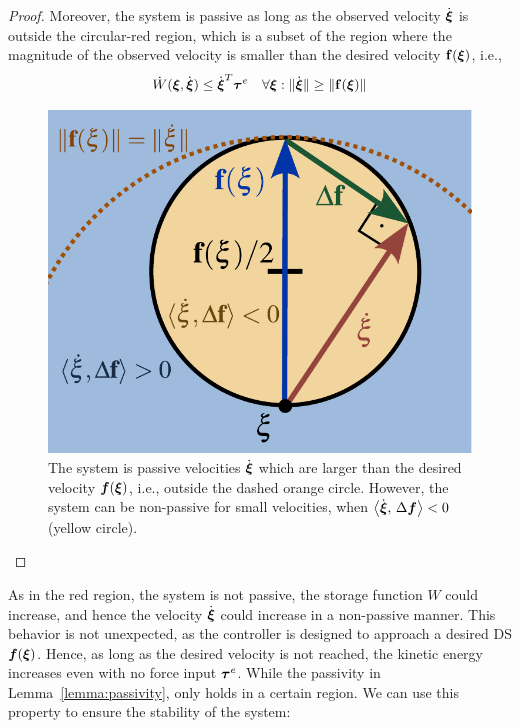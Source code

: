 \begin{proof}
Moreover, the system is passive as long as the observed velocity $\dot{{\boldsymbol{\xi}}}$ is outside the circular-red region, which is a subset of the region where the magnitude of the observed velocity is smaller than the desired velocity $\mathbf{f}({\boldsymbol{\xi}})$, i.e.,
\begin{equation}
	\dot W({\boldsymbol{\xi}}, \dot{{\boldsymbol{\xi}}}) \leq \dot{{\boldsymbol{\xi}}}^T \boldsymbol{\tau}^e
 \quad \forall {\boldsymbol{\xi}} : \| \dot{{\boldsymbol{\xi}}} \| \geq\| \mathbf{f}({\boldsymbol{\xi}}) \| 
\end{equation}

\begin{figure}[b]
	\centering
    \includegraphics[width=0.7\columnwidth]{figures/passivity_analysis}
	\caption{The system is passive velocities $\dot{\boldsymbol{\xi}}$ which are larger than the desired velocity $\boldsymbol{f}(\boldsymbol{\xi})$, i.e., outside the dashed orange circle.
    However, the system can be non-passive for small velocities, when  $\left\langle {\dot{\boldsymbol{\xi}}}, \, {\Delta \boldsymbol{f}} \right\rangle < 0$ (yellow circle). }
	\label{fig:passivity_analysis}
\end{figure}

\end{proof}

As in the red region, the system is not passive, the storage function $W$ could increase, and hence the velocity $\dot {\boldsymbol{\xi}}$ could increase in a non-passive manner. This behavior is not unexpected, as the controller is designed to approach a desired DS $\boldsymbol{f}({\boldsymbol{\xi}})$. Hence, as long as the desired velocity is not reached, the kinetic energy increases even with no force input $\boldsymbol{\tau}^e$. While the passivity in Lemma~\ref{lemma:passivity}, only holds in a certain region. We can use this property to ensure the stability of the system:

